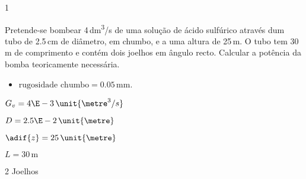 \documentclass[\mainfilename]{subfiles}
\begin{document}
\begin{questionBox}1{} %
    
    Pretende-se bombear 4\,\unit{\deci\metre^3/\second} de uma solução de ácido sulfúrico através dum tubo de 2.5\,\unit{\centi\metre} de diâmetro, em chumbo, e a uma altura de 25\,\unit{\metre}. O tubo tem 30\,\unit{\metre} de comprimento e contém dois joelhos em ângulo recto. Calcular a potência da bomba teoricamente necessária. 
    \begin{itemize}
        \item \(\text{rugosidade chumbo} = 0.05\,\unit{\milli\metre}\).
    \end{itemize}

    \vspace{1ex}

    \begin{itemize}
        \begin{multicols}{3}
            \item \( G_v = 4\E-3\,\unit{\metre^3/s} \)
            \item \( D = 2.5\E-2\,\unit{\metre} \)
            \item \( \adif{z} = 25\,\unit{\metre} \)
            \item \( L = 30\,\unit{\metre} \)
            \item 2 Joelhos 
        \end{multicols}
    \end{itemize}


\end{questionBox}
\end{document}
